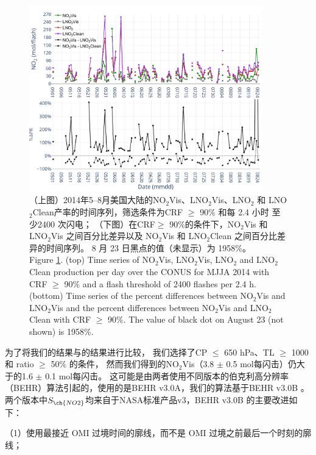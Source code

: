 \begin{figure}[H]
\centering
\includegraphics[width=0.9\textwidth]{./figures/us_pe_timeseries.png}
\caption{（上图）2014年5--8月美国大陆的NO$_2$Vis、LNO$_2$Vis、LNO$_2$ 和 LNO$_2$Clean产率的时间序列，筛选条件为CRF $\geq$ 90\% 和每 2.4 小时 至少2400 次闪电；
（下图）在CRF$\geq$ 90\%的条件下，NO$_2$Vis 和 LNO$_2$Vis 之间百分比差异以及 NO$_2$Vis 和 LNO$_2$Clean 之间百分比差异的时间序列。
8 月 23 日黑点的值（未显示）为 1958\%。\\
Figure \ref{fig:us_pe_timeseries}. (top) Time series of NO$_2$Vis, LNO$_2$Vis, LNO$_2$ and LNO$_2$Clean production per day over the CONUS for MJJA 2014 with CRF $\geq$ 90\% and a flash threshold of 2400 flashes per 2.4 h.
(bottom) Time series of the percent differences between NO$_2$Vis and LNO$_2$Vis and the percent differences between NO$_2$Vis and LNO$_2$Clean with CRF $\geq$ 90\%.
The value of black dot on August 23 (not shown) is 1958\%.}
\label{fig:us_pe_timeseries}
\end{figure}


为了将我们的结果与\citet{Lapierre.2020}的结果进行比较，
我们选择了CP $\leq$ 650 hPa、TL $\geq$ 1000 和 ratio $\geq$ 50\% 的条件，
然而我们得到的NO$_2$Vis（3.8 $\pm$ 0.5 mol每闪击）仍大于\citet{Lapierre.2020}的1.6 $\pm$ 0.1 mol每闪击。
这可能是由两者使用不同版本的伯克利高分辨率（BEHR）算法引起的，\citet{Lapierre.2020}使用的是BEHR v3.0A，我们的算法基于BEHR v3.0B \citep{Laughner.2019a}。
两个版本中$S_{\ch{NO2}}$均来自于NASA标准产品v3，BEHR v3.0B 的主要改进如下：

（1）使用最接近 OMI 过境时间的廓线，而不是 OMI 过境之前最后一个时刻的廓线；

